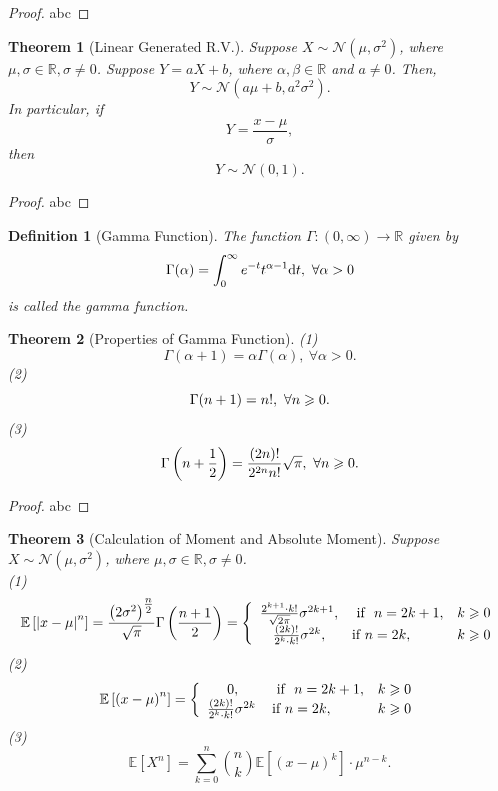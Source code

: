 \documentclass[openany,12pt]{book}
\newtheorem{theorem}{Theorem}[chapter]
\newtheorem{definition}{Definition}[chapter]
\begin{document}
\begin{proof}
  abc
\end{proof}

\begin{theorem}[Linear Generated R.V.]
  Suppose $X\sim \mathcal{N}(\mu,\sigma^2)$, where $\mu,\sigma\in\mathbb{R}, \sigma\neq0$. Suppose $Y=aX+b$, where $\alpha,\beta\in\mathbb{R}$ and $a\neq0$. Then,
  $$
    Y\sim \mathcal{N}\left(a\mu+b,a^2\sigma^2\right).
  $$
  In particular, if
  $$
    Y=\frac{x-\mu}{\sigma},
  $$
  then
  $$
    Y\sim \mathcal{N}(0,1).
  $$
\end{theorem}

\begin{proof}
  abc
\end{proof}

\begin{definition}[Gamma Function]
  The function $\Gamma:(0,\infty)\to\mathbb{R}$ given by
  $$
    {\Gamma}(\alpha)=\int_{0}^{\infty}e^{-t}t^{\alpha-1}\mathrm{d} t,~\forall\alpha>0
  $$
  is called the gamma function.
\end{definition}

\begin{theorem}[Properties of Gamma Function]
  (1)
  $$
    {\Gamma}(\alpha+1)=\alpha\Gamma(\alpha),~\forall\alpha>0.
  $$
  (2)
  $$
    {\Gamma}(n+1)=n!,~\forall n\geqslant0.
  $$
  (3)
  $$
    {\Gamma}\left(n+\frac{1}{2}\right)=\frac{\left(2n\right)!}{2^{2n}n!}\sqrt\pi,~\forall n\geqslant0.
  $$
\end{theorem}

\begin{proof}
  abc
\end{proof}

\begin{theorem}[Calculation of Moment and Absolute Moment]
  Suppose $X\sim \mathcal{N}(\mu,\sigma^2)$, where $\mu,\sigma\in\mathbb{R},  \sigma\neq0$.\\
  (1)
  \[\mathbb{E}\left[ \left| x - \mu \right|^{n} \right] = \frac{\left( 2\sigma^{2} \right)^{\tfrac{n}{2}}}{\sqrt{\pi}}\Gamma\left( \frac{n + 1}{2} \right)= \left\{ \begin{array}{cll}
      \frac{2^{k + 1} \cdot k!}{\sqrt{2\pi}}\sigma^{2k + 1}, & ~\text{if}~~n = 2k + 1, & k \geqslant 0 \\
      \frac{(2k)!}{2^{k} \cdot k!}\sigma^{2k},               & \text{if}~n = 2k,       & k \geqslant 0 \\
    \end{array} \right.\]
  (2)
  \[\mathbb{E}\left[ {(x - \mu)}^{n} \right] = \left\{ \begin{array}{cll}
      0,                                        & ~\text{if}~~n = 2k + 1, & k \geqslant 0 \\
      \frac{(2k)!}{2^{k} \cdot k!}\sigma^{2k}\, & {\text{if}}~ n = 2k,    & k \geqslant 0 \\
    \end{array} \right.\]
  (3)
  \[\mathbb{E}[X^{n}] = \sum_{k = 0}^{n}\binom n k \mathbb{E}\left[ \left( x - \mu \right)^{k} \right]\cdot \mu^{n - k}.\]
\end{theorem}
\end{document}
